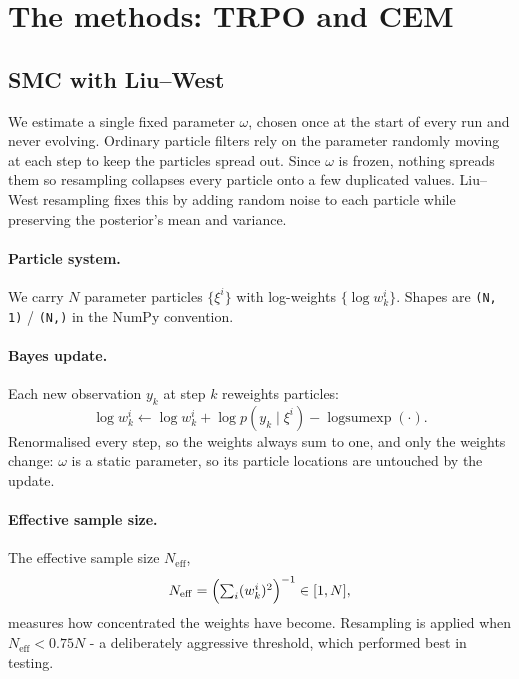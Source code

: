 \documentclass[12pt,a4paper]{article}
\begin{document}
\section{The methods: TRPO and CEM}
\label{sec:the-methods}

\subsection{SMC with Liu--West}
\label{sec:smc-liu-west}

We estimate a single fixed parameter $\omega$, chosen once at the start of every run and never
evolving. Ordinary particle filters rely on the parameter randomly moving at each step to
keep the particles spread out. Since $\omega$ is frozen, nothing spreads them so resampling collapses every particle onto a few
duplicated values.
Liu--West resampling fixes this by adding random noise to
each particle while preserving the posterior's mean and variance.

\paragraph{Particle system.}
We carry $N$ parameter particles $\{\xi^i\}$ with log-weights $\{\log w_k^i\}$.
Shapes are \texttt{(N, 1)} / \texttt{(N,)} in the NumPy convention.

\paragraph{Bayes update.}
Each new observation $y_k$ at step $k$ reweights particles:
\begin{equation}
\log w_k^i \leftarrow \log w_k^i
  + \log p(y_k \mid \xi^i)
  - \operatorname{logsumexp}(\cdot).
\label{eq:bayes-update}
\end{equation}
Renormalised every step, so the weights always sum to one, and only the
weights change: $\omega$ is a static parameter, so its particle
locations are untouched by the update.

\paragraph{Effective sample size.}
The effective sample size $N_{\mathrm{eff}}$,
\begin{equation}
N_{\mathrm{eff}} = \Bigl(\textstyle\sum_i (w_k^i)^{2}\Bigr)^{-1} \in [1, N],
\end{equation}
measures how concentrated the weights have become. Resampling is applied when
$N_{\mathrm{eff}} < 0.75N$ - a deliberately aggressive threshold, which performed best in testing.
\end{document}

